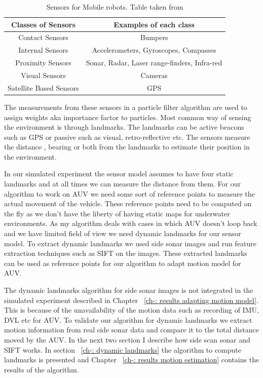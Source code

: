 \documentclass[12pt]{dalcsthesis}
\begin{document}
\begin {table}[tbh]
\centering
\begin{tabular}{|c|c|}
\hline 
Classes of Sensors & Examples of each class \\ 
\hline 
Contact Sensors & Bumpers \\ 
\hline 
Internal Sensors & Accelerometers, Gyroscopes, Compasses \\ 
\hline 
Proximity Sensors & Sonar, Radar, Laser range-finders, Infra-red \\ 
\hline 
Visual Sensors  & Cameras \\ 
\hline 
Satellite Based Sensors & GPS \\ 
\hline 
\end{tabular}
\caption{\label{tab-: classes of sensors} Sensors for Mobile robots. Table taken from \cite{thrun2005probabilistic}}
\end{table}
The measurements from these sensors in a particle filter algorithm are used to assign weights aka importance factor to particles. Most common way of sensing the environment is through landmarks. The landmarks can be active beacons such as GPS or passive such as visual, retro-reflective etc. The sensors measure the distance , bearing or both from the landmarks to estimate their position in the environment. 

In our simulated experiment the sensor model assumes to have four static landmarks and at all times we can measure the distance from them. For our algorithm to work on AUV we need some sort of reference points to measure the actual movement of the vehicle. These reference points need to be computed on the fly as we don't have the liberty of having static maps for underwater environments. As my algorithm deals with cases in which AUV doesn't loop back and we have limited field of view we need dynamic landmarks for our sensor model. To extract dynamic landmarks we used side sonar images and run feature extraction techniques such as SIFT on the images. These extracted landmarks can be used as reference points for our algorithm to adapt motion model for AUV.

The dynamic landmarks algorithm for side sonar images is not integrated in the simulated experiment described in Chapter ~\ref{ch-: results adapting motion model}. This is because of the unavailability of the motion data such as recording of IMU, DVL etc for AUV. To validate our algorithm for dynamic landmarks we extract motion information from real side sonar data and compare it to the total distance moved by the AUV. In the next two section I describe how side scan sonar and SIFT works. In section ~\ref{ch-: dynamic landmarks} the algorithm to compute landmarks is presented and Chapter ~\ref{ch-: results motion estimation} contains the results of the algorithm.  
\end{document}
